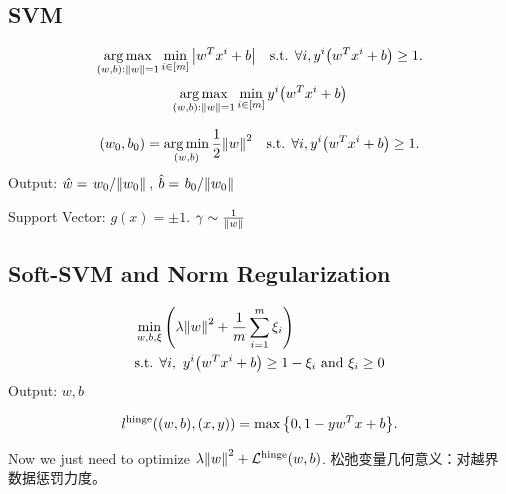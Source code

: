 \documentclass[a4paper,landscape]{article}
\begin{document}
\begin{tiny}
\begin{multicols}{4}

		\section{SVM}
		\[
			\mathop{\arg\max}_{(w,b):\norm{w}=1}\min_{i\in[m]}\qty|w^Tx^i+b|
			\ \ \
			\text{s.t. }\forall i, y^i\qty(w^Tx^i+b)\ge 1
			.\]
		\begin{equation}
			\mathop{\arg\max}_{(w,b):\norm{w}=1}\min_{i\in[m]}y^i\qty(w^Tx^i+b)
		\end{equation}
		\begin{md}
			\[
				(w_0,b_0)=\mathop{\arg\min}_{(w,b)}\frac{1}{2}\norm{w}^2
				\ \ \
				\text{s.t. }\forall i, y^i\qty(w^Tx^i+b)\ge 1.
				\label{svm}
			\]
			Output: $\hat{w}=\flatfrac{w_0}{\norm{w_0}}$, $\hat{b}=\flatfrac{b_0}{\norm{w_0}}$
		\end{md}
		Support Vector: $g(x)=\pm 1$. $\gamma\sim \frac{1}{\norm{w}}$

		\subsection{Soft-SVM and Norm Regularization}
		\begin{md}
			\[
				\begin{aligned}
					 & \min_{w,b,\xi}\qty(\lambda\norm{w}^2+\frac{1}{m}\sum_{i=1}^m\xi_i)
					\\
					 & \text{s.t. }\forall i,\ y^i\qty(w^Tx^i+b)\ge 1-\xi_i \text{ and }
					\xi_i\ge 0
				\end{aligned}
			\]
			Output: $w,b$
		\end{md}
		\begin{defi}
			\[
				l^{\mathrm{hinge}}((w,b),(x,y))=\max\qty{0,1-yw^Tx+b}
				.\]
		\end{defi}
		Now we just need to optimize $\lambda\norm{w}^2+\mathcal{L}^{\mathrm{hinge}}(w,b)$.
		松弛变量几何意义：对越界数据惩罚力度。


\end{multicols}
\end{tiny}
\end{document}
